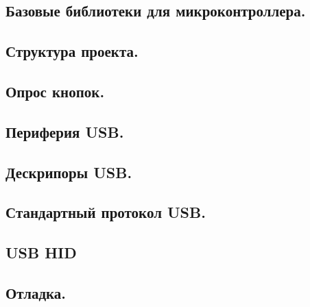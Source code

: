 \documentclass[12pt,a4paper]{article}
\begin{document}
\subsection{Базовые библиотеки для микроконтроллера.}

\subsection{Структура проекта.}

\subsection{Опрос кнопок.}

\subsection{Периферия USB.}

\subsection{Дескрипоры USB.}

\subsection{Стандартный протокол USB.}

\subsection{USB HID}

\subsection{Отладка.}



\end{document}
